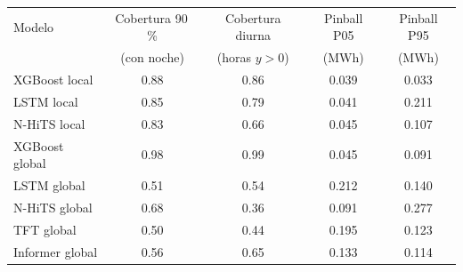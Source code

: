 \begin{tabular}{lcccc}
\toprule
Modelo & Cobertura 90\,\% & Cobertura diurna & Pinball P05 & Pinball P95 \\
 & (con noche) & (horas $y>0$) & (MWh) & (MWh) \\
\midrule
XGBoost local & 0.88 & 0.86 & 0.039 & 0.033 \\
LSTM local & 0.85 & 0.79 & 0.041 & 0.211 \\
N-HiTS local & 0.83 & 0.66 & 0.045 & 0.107 \\
XGBoost global & 0.98 & 0.99 & 0.045 & 0.091 \\
LSTM global & 0.51 & 0.54 & 0.212 & 0.140 \\
N-HiTS global & 0.68 & 0.36 & 0.091 & 0.277 \\
TFT global & 0.50 & 0.44 & 0.195 & 0.123 \\
Informer global & 0.56 & 0.65 & 0.133 & 0.114 \\
\bottomrule
\end{tabular}